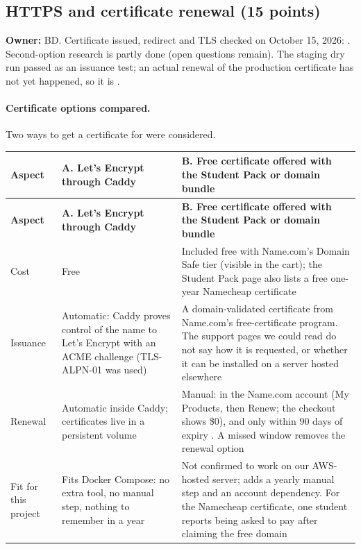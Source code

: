 \subsection{HTTPS and certificate renewal (15 points)}
\label{Section:giteaHttps}
\textbf{Owner:} BD. Certificate issued, redirect and TLS checked on October 15, 2026: \StatusPass{}. Second-option research is partly done (open questions remain). The staging dry run passed as an issuance test; an actual renewal of the production certificate has not yet happened, so it is \StatusPending{}.

\paragraph{Certificate options compared.}
Two ways to get a certificate for \texttt{\GiteaHost} were considered.
\begin{tabularx}{\linewidth}{L{2.8cm}YY}
\caption{Certificate options\label{Table:CertOptions}}\\
\toprule \textbf{Aspect} & \textbf{A. Let's Encrypt through Caddy} & \textbf{B. Free certificate offered with the Student Pack or domain bundle}\\ \midrule
\endfirsthead
\toprule \textbf{Aspect} & \textbf{A. Let's Encrypt through Caddy} & \textbf{B. Free certificate offered with the Student Pack or domain bundle}\\ \midrule
\endhead \bottomrule \endlastfoot
Cost & Free \cite{CaddyAutoHTTPS} & Included free with Name.com's Domain Safe tier (visible in the cart); the Student Pack page also lists a free one-year Namecheap certificate \cite{NameDomainSafe,GitHubPackDomains}\\
Issuance & Automatic: Caddy proves control of the name to Let's Encrypt with an ACME challenge (TLS-ALPN-01 was used) \cite{LetsEncryptChallenges} & A domain-validated certificate from Name.com's free-certificate program. The support pages we could read do not say how it is requested, or whether it can be installed on a server hosted elsewhere \cite{NameDomainSafe}\\
Renewal & Automatic inside Caddy; certificates live in a persistent volume & Manual: in the Name.com account (My Products, then Renew; the checkout shows \$0), and only within 90 days of expiry \cite{NameRenewSSL}. A missed window removes the renewal option\\
Fit for this project & Fits Docker Compose: no extra tool, no manual step, nothing to remember in a year & Not confirmed to work on our AWS-hosted server; adds a yearly manual step and an account dependency. For the Namecheap certificate, one student reports being asked to pay after claiming the free domain \cite{NamecheapCommunity}\\
\end{tabularx}
